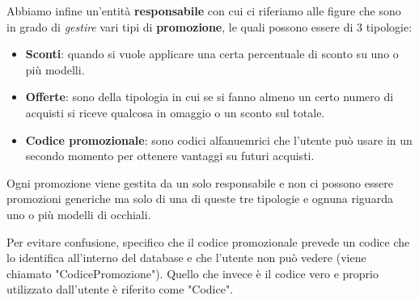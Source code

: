Abbiamo infine un'entità \textbf{responsabile} con cui ci riferiamo alle figure che sono in
grado di \emph{gestire} vari tipi di \textbf{promozione}, le quali possono essere di 3 tipologie:
\begin{itemize}
	\item \textbf{Sconti}: quando si vuole applicare una certa percentuale di sconto su uno o più
	      modelli.
	\item \textbf{Offerte}: sono della tipologia in cui se si fanno almeno un certo numero di
	      acquisti si riceve qualcosa in omaggio o un sconto sul totale.
	\item \textbf{Codice promozionale}: sono codici alfanuemrici che l'utente può usare in un
	      secondo momento per ottenere vantaggi su futuri acquisti.
\end{itemize}
Ogni promozione viene gestita da un solo responsabile e non ci possono essere promozioni generiche
ma solo di una di queste tre tipologie e ognuna riguarda uno o più modelli di occhiali.

Per evitare confusione, specifico che il codice promozionale prevede un codice che lo identifica
all'interno del database e che l'utente non può vedere (viene chiamato "CodicePromozione"). Quello
che invece è il codice vero e proprio utilizzato dall'utente è riferito come "Codice".
